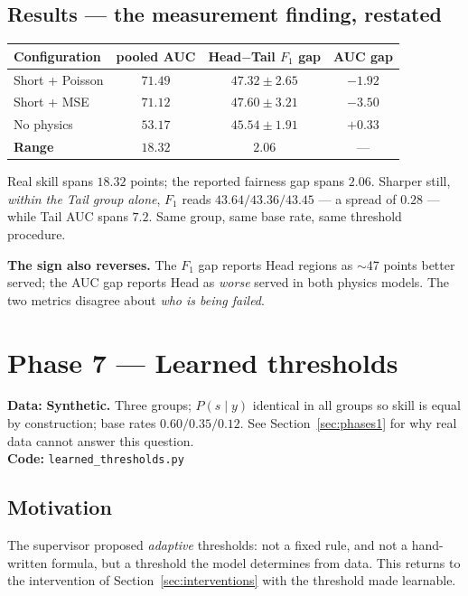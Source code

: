 \documentclass[11pt,a4paper]{article}
\newcommand{\datatag}[2]{%
  \begin{center}\small
  \colorbox{boxbg}{\parbox{0.965\linewidth}{\textbf{Data:} #1 \\ \textbf{Code:} \texttt{#2}}}
  \end{center}}
\begin{document}
\subsection{Results --- the measurement finding, restated}
\begin{center}
\begin{tabular}{lccc}
\toprule
Configuration & pooled AUC & Head$-$Tail $F_1$ gap & AUC gap \\
\midrule
Short + Poisson & $71.49$ & $47.32\pm2.65$ & $\mathbf{-1.92}$ \\
Short + MSE & $71.12$ & $47.60\pm3.21$ & $\mathbf{-3.50}$ \\
No physics & $53.17$ & $45.54\pm1.91$ & $+0.33$ \\
\midrule
\textbf{Range} & $\mathbf{18.32}$ & $\mathbf{2.06}$ & --- \\
\bottomrule
\end{tabular}
\end{center}
\noindent Real skill spans $18.32$ points; the reported fairness gap spans
$2.06$. Sharper still, \emph{within the Tail group alone}, $F_1$ reads
$43.64 / 43.36 / 43.45$ --- a spread of $\mathbf{0.28}$ --- while Tail AUC spans
$\mathbf{7.2}$. Same group, same base rate, same threshold procedure.

\medskip
\noindent \textbf{The sign also reverses.} The $F_1$ gap reports Head regions as
$\sim$47 points better served; the AUC gap reports Head as \emph{worse} served
in both physics models. The two metrics disagree about \emph{who is being
failed}.

\section{Phase 7 --- Learned thresholds}\label{sec:learned}
\datatag{\textbf{Synthetic.} Three groups; $P(s\mid y)$ identical in all groups so skill is equal by construction; base rates $0.60 / 0.35 / 0.12$. See Section~\ref{sec:phases1} for why real data cannot answer this question.}{learned\_thresholds.py}

\subsection{Motivation}
The supervisor proposed \emph{adaptive} thresholds: not a fixed rule, and not a
hand-written formula, but a threshold the model determines from data. This
returns to the intervention of Section~\ref{sec:interventions} with the
threshold made learnable.
\end{document}
